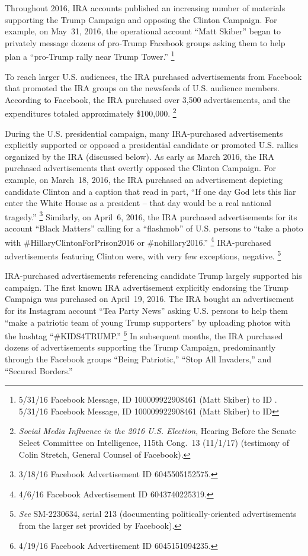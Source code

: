 Throughout 2016, IRA accounts published an increasing number of materials supporting the Trump Campaign and opposing the Clinton Campaign.
For example, on May~31, 2016, the operational account ``Matt Skiber'' began to privately message dozens of pro-Trump Facebook groups asking them to help plan a ``pro-Trump rally near Trump Tower.''%
\footnote{5/31/16 Facebook Message, ID 100009922908461 (Matt Skiber) to ID .
5/31/16 Facebook Message, ID 100009922908461 (Matt Skiber) to ID }

To reach larger U.S. audiences, the IRA purchased advertisements from Facebook that promoted the IRA groups on the newsfeeds of U.S. audience members.
According to Facebook, the IRA purchased over 3,500 advertisements, and the expenditures totaled approximately \$100,000.%
\footnote{\textit{Social Media Influence in the 2016 U.S. Election}, Hearing Before the Senate Select Committee on Intelligence, 115th Cong.~13 (11/1/17) (testimony of Colin Stretch, General Counsel of Facebook).}

During the U.S. presidential campaign, many IRA-purchased advertisements explicitly supported or opposed a  presidential candidate or promoted U.S. rallies organized by the IRA (discussed below).
As early as March 2016, the IRA purchased advertisements that overtly opposed the Clinton Campaign.
For example, on March~18, 2016, the IRA purchased an advertisement depicting candidate Clinton and a caption that read in part, ``If one day God lets this liar enter the White House as a president -- that day would be a  real national tragedy.''%
\footnote{3/18/16 Facebook Advertisement ID 6045505152575.}
Similarly, on April~6, 2016, the IRA purchased advertisements for its account ``Black Matters'' calling for a ``flashmob'' of U.S. persons to ``take a photo with \#HillaryClintonForPrison2016 or \#nohillary2016.''%
\footnote{4/6/16 Facebook Advertisement ID 6043740225319.}
IRA-purchased advertisements featuring Clinton were, with very few exceptions, negative.%
\footnote{\textit{See} SM-2230634, serial 213 (documenting politically-oriented advertisements from the larger set provided by Facebook).}

IRA-purchased advertisements referencing candidate Trump largely supported his campaign.
The first known IRA advertisement explicitly endorsing the Trump Campaign was purchased on April~19, 2016.
The IRA bought an advertisement for its Instagram account ``Tea Party News'' asking U.S. persons to help them ``make a patriotic team of young Trump supporters'' by uploading photos with the hashtag ``\#KIDS4TRUMP.''%
\footnote{4/19/16 Facebook Advertisement ID 6045151094235.}
In subsequent months, the IRA purchased dozens of advertisements supporting the Trump Campaign, predominantly through the Facebook groups ``Being Patriotic,'' ``Stop All Invaders,'' and ``Secured Borders.''

